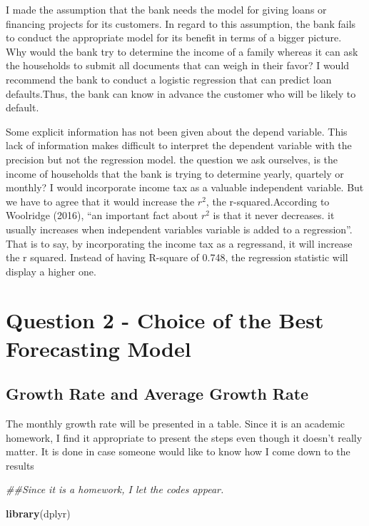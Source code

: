 \documentclass[
]{article}
\newenvironment{Shaded}{\begin{snugshade}}{\end{snugshade}}
\newcommand{\CommentTok}[1]{\textcolor[rgb]{0.56,0.35,0.01}{\textit{#1}}}
\newcommand{\KeywordTok}[1]{\textcolor[rgb]{0.13,0.29,0.53}{\textbf{#1}}}
\newcommand{\NormalTok}[1]{#1}
\begin{document}
I made the assumption that the bank needs the model for giving loans or
financing projects for its customers. In regard to this assumption, the
bank fails to conduct the appropriate model for its benefit in terms of
a bigger picture. Why would the bank try to determine the income of a
family whereas it can ask the households to submit all documents that
can weigh in their favor? I would recommend the bank to conduct a
logistic regression that can predict loan defaults.Thus, the bank can
know in advance the customer who will be likely to default.

Some explicit information has not been given about the depend variable.
This lack of information makes difficult to interpret the dependent
variable with the precision but not the regression model. the question
we ask ourselves, is the income of households that the bank is trying to
determine yearly, quartely or monthly? I would incorporate income tax as
a valuable independent variable. But we have to agree that it would
increase the \(r^2\), the r-squared.According to Woolridge (2016), ``an
important fact about \(r^2\) is that it never decreases. it usually
increases when independent variables variable is added to a
regression''. That is to say, by incorporating the income tax as a
regressand, it will increase the r squared. Instead of having R-square
of 0.748, the regression statistic will display a higher one.

\hypertarget{question-2---choice-of-the-best-forecasting-model}{%
\section{Question 2 - Choice of the Best Forecasting
Model}\label{question-2---choice-of-the-best-forecasting-model}}

\hypertarget{growth-rate-and-average-growth-rate}{%
\subsection{Growth Rate and Average Growth
Rate}\label{growth-rate-and-average-growth-rate}}

The monthly growth rate will be presented in a table. Since it is an
academic homework, I find it appropriate to present the steps even
though it doesn't really matter. It is done in case someone would like
to know how I come down to the results

\begin{Shaded}
\begin{Highlighting}[]
\CommentTok{##Since it is a homework, I let the codes appear.}

\KeywordTok{library}\NormalTok{(dplyr)}
\end{Highlighting}
\end{Shaded}
\end{document}
